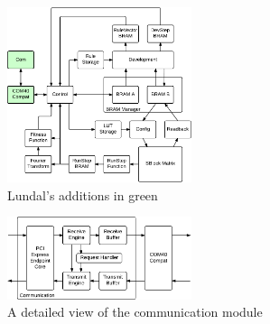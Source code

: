 
\begin{figure}[!ht]
    \centering
    \includegraphics[width=0.48\textwidth]{figures/overview-lundal}
    \caption{Lundal's additions in green}
    \label{fig:overview-lundal}
\end{figure}

\begin{figure}[!ht]
    \centering
    \includegraphics[width=0.48\textwidth]{figures/details-communication}
    \caption{A detailed view of the communication module}
    \label{fig:details-communication}
\end{figure}

